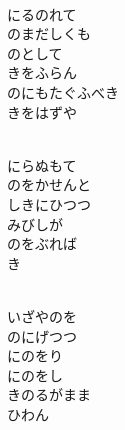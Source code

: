 \documentclass[10pt,b5j]{tarticle} %
\begin{document}
\begin{enumerate}
\begin{minipage}[c]{\blocksize}
        \vspace{\linespace}
        \item~\\
        にるのれて\\
        のまだしくも\\
        のとして\\
        きをふらん\\
        のにもたぐふべき\\
        きをはずや
        
        \vspace{\linespace}
        \item~\\
        にらぬもて\\
        のをかせんと\\
        しきにひつつ\\
        みびしが\\
        のをぶれば\\
        き
        
        \vspace{\linespace}
        \item~\\
        いざやのを\\
        のにげつつ\\
        にのをり\\
        にのをし\\
        きのるがまま\\
        ひわん
    
    \end{minipage}
\end{enumerate} %
\end{document}
